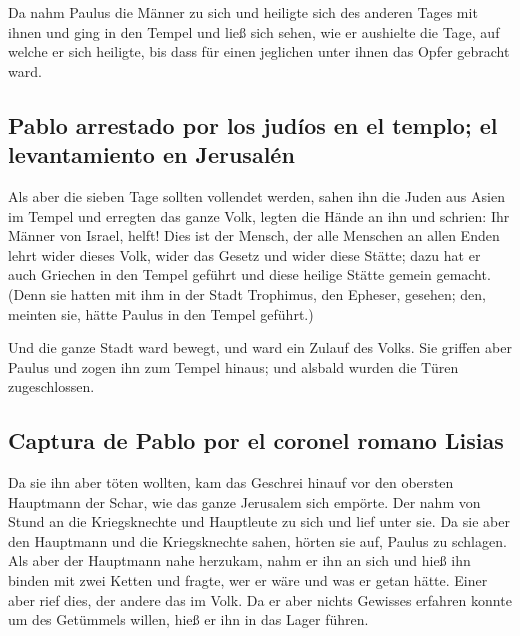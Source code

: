  Da nahm Paulus die Männer zu sich und heiligte sich des
anderen Tages mit ihnen und ging in den Tempel und ließ sich sehen, wie
er aushielte die Tage, auf welche er sich heiligte, bis dass für einen
jeglichen unter ihnen das Opfer gebracht ward.

\hypertarget{pablo-arrestado-por-los-juduxedos-en-el-templo-el-levantamiento-en-jerusaluxe9n}{%
\subsection{Pablo arrestado por los judíos en el templo; el
levantamiento en
Jerusalén}\label{pablo-arrestado-por-los-juduxedos-en-el-templo-el-levantamiento-en-jerusaluxe9n}}

 Als aber die sieben Tage sollten vollendet werden, sahen
ihn die Juden aus Asien im Tempel und erregten das ganze Volk, legten
die Hände an ihn und schrien:  Ihr Männer von Israel,
helft! Dies ist der Mensch, der alle Menschen an allen Enden lehrt wider
dieses Volk, wider das Gesetz und wider diese Stätte; dazu hat er auch
Griechen in den Tempel geführt und diese heilige Stätte gemein gemacht.
 (Denn sie hatten mit ihm in der Stadt Trophimus, den
Epheser, gesehen; den, meinten sie, hätte Paulus in den Tempel geführt.)

 Und die ganze Stadt ward bewegt, und ward ein Zulauf des
Volks. Sie griffen aber Paulus und zogen ihn zum Tempel hinaus; und
alsbald wurden die Türen zugeschlossen.

\hypertarget{captura-de-pablo-por-el-coronel-romano-lisias}{%
\subsection{Captura de Pablo por el coronel romano
Lisias}\label{captura-de-pablo-por-el-coronel-romano-lisias}}

 Da sie ihn aber töten wollten, kam das Geschrei hinauf
vor den obersten Hauptmann der Schar, wie das ganze Jerusalem sich
empörte.  Der nahm von Stund an die Kriegsknechte und
Hauptleute zu sich und lief unter sie. Da sie aber den Hauptmann und die
Kriegsknechte sahen, hörten sie auf, Paulus zu schlagen. 
Als aber der Hauptmann nahe herzukam, nahm er ihn an sich und hieß ihn
binden mit zwei Ketten und fragte, wer er wäre und was er getan hätte.
 Einer aber rief dies, der andere das im Volk. Da er aber
nichts Gewisses erfahren konnte um des Getümmels willen, hieß er ihn in
das Lager führen.

